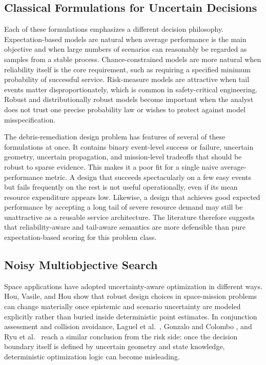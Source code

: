 \subsection{Classical Formulations for Uncertain Decisions}
Each of these formulations emphasizes a different decision philosophy. Expectation-based models are natural when average performance is the main objective and when large numbers of scenarios can reasonably be regarded as samples from a stable process. Chance-constrained models are more natural when reliability itself is the core requirement, such as requiring a specified minimum probability of successful service. Risk-measure models are attractive when tail events matter disproportionately, which is common in safety-critical engineering. Robust and distributionally robust models become important when the analyst does not trust one precise probability law or wishes to protect against model misspecification.

The debris-remediation design problem has features of several of these formulations at once. It contains binary event-level success or failure, uncertain geometry, uncertain propagation, and mission-level tradeoffs that should be robust to sparse evidence. This makes it a poor fit for a single naive average-performance metric. A design that succeeds spectacularly on a few easy events but fails frequently on the rest is not useful operationally, even if its mean resource expenditure appears low. Likewise, a design that achieves good expected performance by accepting a long tail of severe resource demand may still be unattractive as a reusable service architecture. The literature therefore suggests that reliability-aware and tail-aware semantics are more defensible than pure expectation-based scoring for this problem class.

\subsection{Noisy Multiobjective Search}
Space applications have adopted uncertainty-aware optimization in different ways. Hou, Vasile, and Hou \cite{HouVasileHou2019} show that robust design choices in space-mission problems can change materially once epistemic and scenario uncertainty are modeled explicitly rather than buried inside deterministic point estimates. In conjunction assessment and collision avoidance, Laguel et al.\ \cite{LaguelMalickVanAckooij2021}, Gonzalo and Colombo \cite{GonzaloColombo2020}, and Ryu et al.\ \cite{RyuBouvierLalani2024} reach a similar conclusion from the risk side: once the decision boundary itself is defined by uncertain geometry and state knowledge, deterministic optimization logic can become misleading.

